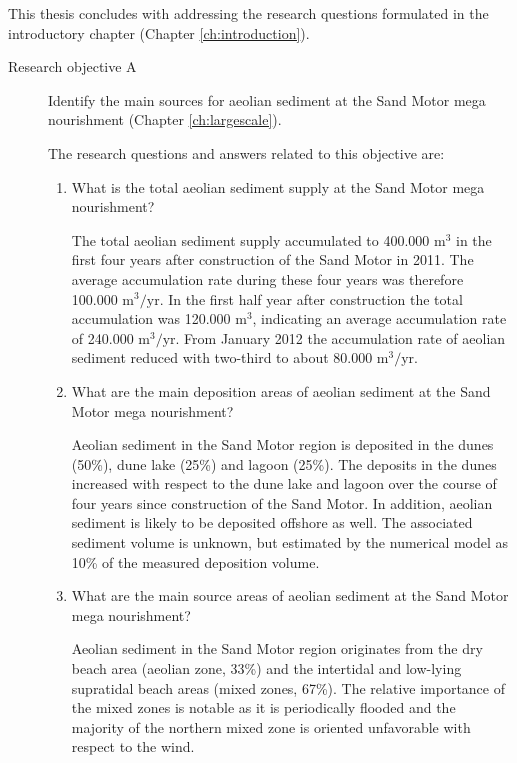 This thesis concludes with addressing the research questions
formulated in the introductory chapter (Chapter
\ref{ch:introduction}).

\begin{description}
\item[Research objective A] Identify the main sources for aeolian
  sediment at the Sand Motor mega nourishment (Chapter
  \ref{ch:largescale}).

  \medskip

  The research questions and answers related to this objective are:

  \begin{enumerate}[{A}1]
  \item What is the total aeolian sediment supply at the Sand Motor
    mega nourishment?

    The total aeolian sediment supply accumulated to 400.000
    $\mathrm{m^3}$ in the first four years after construction of the
    Sand Motor in 2011. The average accumulation rate during these
    four years was therefore 100.000 $\mathrm{m^3/yr}$. In the first
    half year after construction the total accumulation was 120.000
    $\mathrm{m^3}$, indicating an average accumulation rate of 240.000
    $\mathrm{m^3/yr}$. From January 2012 the accumulation rate of
    aeolian sediment reduced with two-third to about 80.000
    $\mathrm{m^3/yr}$.

  \item What are the main deposition areas of aeolian sediment at the
    Sand Motor mega nourishment?

    Aeolian sediment in the Sand Motor region is deposited in the
    dunes (50\%), dune lake (25\%) and lagoon (25\%). The deposits in
    the dunes increased with respect to the dune lake and lagoon over
    the course of four years since construction of the Sand Motor. In
    addition, aeolian sediment is likely to be deposited offshore as
    well. The associated sediment volume is unknown, but estimated by
    the numerical model as 10\% of the measured deposition volume.

  \item What are the main source areas of aeolian sediment at the Sand
    Motor mega nourishment?

    Aeolian sediment in the Sand Motor region originates from the dry
    beach area (aeolian zone, 33\%) and the intertidal and low-lying
    supratidal beach areas (mixed zones, 67\%). The relative
    importance of the mixed zones is notable as it is periodically
    flooded and the majority of the northern mixed zone is oriented
    unfavorable with respect to the wind.


\end{enumerate}
\end{description}
